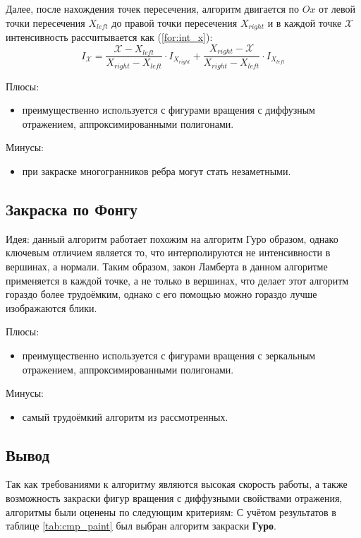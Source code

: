 Далее, после нахождения точек пересечения, алгоритм двигается по $Ox$ от левой
точки пересечения $X_{left}$ до правой точки пересечения $X_{right}$ и в каждой
точке $\mathcal{X}$ интенсивность рассчитывается как (\ref{for:int_x}):
\begin{equation}
    \label{for:int_x}
    I_{\mathcal{X}} = \frac{\mathcal{X} - X_{left}}{X_{right} - X_{left}} \cdot
    I_{X_{right}} + \frac{X_{right} - \mathcal{X}}{X_{right} - X_{left}} \cdot
    I_{X_{left}}
\end{equation}

Плюсы:
\begin{itemize}
    \item преимущественно используется с фигурами вращения с диффузным
        отражением, аппроксимированными полигонами.
\end{itemize}

Минусы:
\begin{itemize}
    \item при закраске многогранников ребра могут стать незаметными.
\end{itemize}

\subsection{Закраска по Фонгу}
Идея: данный алгоритм работает похожим на алгоритм Гуро образом, однако
ключевым отличием является то, что интерполируются не интенсивности в вершинах,
а нормали\cite{lmodels}. Таким образом, закон Ламберта в данном алгоритме
применяется в каждой точке, а не только в вершинах, что делает этот алгоритм
гораздо более трудоёмким, однако с его помощью можно гораздо лучше изображаются
блики.

Плюсы:
\begin{itemize}
    \item преимущественно используется с фигурами вращения с зеркальным
        отражением, аппроксимированными полигонами.
\end{itemize}

Минусы:
\begin{itemize}
    \item самый трудоёмкий алгоритм из рассмотренных\cite{rogers}.
\end{itemize}

\subsection*{Вывод}

 Так как требованиями к алгоритму являются высокая скорость работы, а также
 возможность закраски фигур вращения с диффузными свойствами отражения,
 алгоритмы были оценены по следующим критериям: С учётом результатов в таблице
 \ref{tab:cmp_paint} был выбран алгоритм закраски \textbf{Гуро}.
